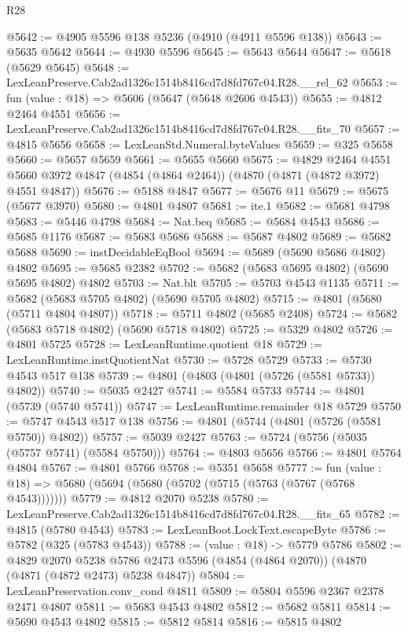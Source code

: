 \begin{lexlean}{R28}
\begin{coremodule}
@5642 := @4905 @5596 @138 @5236 (@4910 (@4911 @5596 @138))
@5643 := @5635 @5642
@5644 := @4930 @5596
@5645 := @5643 @5644
@5647 := @5618 (@5629 @5645)
@5648 := LexLeanPreserve.Cab2ad1326c1514b8416cd7d8fd767c04.R28.__rel_62
@5653 := fun (value : @18) => @5606 (@5647 (@5648 @2606 @4543))
@5655 := @4812 @2464 @4551
@5656 := LexLeanPreserve.Cab2ad1326c1514b8416cd7d8fd767c04.R28.__fits_70
@5657 := @4815 @5656
@5658 := LexLeanStd.Numeral.byteValues
@5659 := @325 @5658
@5660 := @5657 @5659
@5661 := @5655 @5660
@5675 := @4829
    @2464
    @4551
    @5660
    @3972
    @4847
    (@4854 (@4864 @2464))
    (@4870 (@4871 (@4872 @3972) @4551 @4847))
@5676 := @5188 @4847
@5677 := @5676 @11
@5679 := @5675 (@5677 @3970)
@5680 := @4801 @4807
@5681 := ite.{1}
@5682 := @5681 @4798
@5683 := @5446 @4798
@5684 := Nat.beq
@5685 := @5684 @4543
@5686 := @5685 @1176
@5687 := @5683 @5686
@5688 := @5687 @4802
@5689 := @5682 @5688
@5690 := instDecidableEqBool
@5694 := @5689 (@5690 @5686 @4802) @4802
@5695 := @5685 @2382
@5702 := @5682 (@5683 @5695 @4802) (@5690 @5695 @4802) @4802
@5703 := Nat.blt
@5705 := @5703 @4543 @1135
@5711 := @5682 (@5683 @5705 @4802) (@5690 @5705 @4802)
@5715 := @4801 (@5680 (@5711 @4804 @4807))
@5718 := @5711 @4802 (@5685 @2408)
@5724 := @5682 (@5683 @5718 @4802) (@5690 @5718 @4802)
@5725 := @5329 @4802
@5726 := @4801 @5725
@5728 := LexLeanRuntime.quotient @18
@5729 := LexLeanRuntime.instQuotientNat
@5730 := @5728 @5729
@5733 := @5730 @4543 @517 @138
@5739 := @4801 (@4803 (@4801 (@5726 (@5581 @5733)) @4802))
@5740 := @5035 @2427
@5741 := @5584 @5733
@5744 := @4801 (@5739 (@5740 @5741))
@5747 := LexLeanRuntime.remainder @18 @5729
@5750 := @5747 @4543 @517 @138
@5756 := @4801 (@5744 (@4801 (@5726 (@5581 @5750)) @4802))
@5757 := @5039 @2427
@5763 := @5724 (@5756 (@5035 (@5757 @5741) (@5584 @5750)))
@5764 := @4803 @5656
@5766 := @4801 @5764 @4804
@5767 := @4801 @5766
@5768 := @5351 @5658
@5777 := fun (value : @18) => @5680 (@5694 (@5680 (@5702 (@5715 (@5763 (@5767 (@5768 @4543)))))))
@5779 := @4812 @2070 @5238
@5780 := LexLeanPreserve.Cab2ad1326c1514b8416cd7d8fd767c04.R28.__fits_65
@5782 := @4815 (@5780 @4543)
@5783 := LexLeanBoot.LockText.escapeByte
@5786 := @5782 (@325 (@5783 @4543))
@5788 := (value : @18) -> @5779 @5786
@5802 := @4829
    @2070
    @5238
    @5786
    @2473
    @5596
    (@4854 (@4864 @2070))
    (@4870 (@4871 (@4872 @2473) @5238 @4847))
@5804 := LexLeanPreservation.conv_cond @4811
@5809 := @5804 @5596 @2367 @2378 @2471 @4807
@5811 := @5683 @4543 @4802
@5812 := @5682 @5811
@5814 := @5690 @4543 @4802
@5815 := @5812 @5814
@5816 := @5815 @4802

\end{coremodule}
\end{lexlean}
